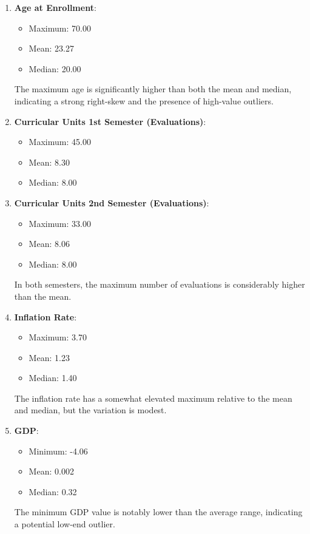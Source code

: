 \documentclass[12pt]{article}
\begin{document}
\begin{enumerate}
    \item \textbf{Age at Enrollment}:
    \begin{itemize}
        \item Maximum: 70.00
        \item Mean: 23.27
        \item Median: 20.00
    \end{itemize}
    The maximum age is significantly higher than both the mean and median, indicating a strong right-skew and the presence of high-value outliers.

    \item \textbf{Curricular Units 1st Semester (Evaluations)}:
    \begin{itemize}
        \item Maximum: 45.00
        \item Mean: 8.30
        \item Median: 8.00
    \end{itemize}

    \item \textbf{Curricular Units 2nd Semester (Evaluations)}:
    \begin{itemize}
        \item Maximum: 33.00
        \item Mean: 8.06
        \item Median: 8.00
    \end{itemize}
    In both semesters, the maximum number of evaluations is considerably higher than the mean.

    \item \textbf{Inflation Rate}:
    \begin{itemize}
        \item Maximum: 3.70
        \item Mean: 1.23
        \item Median: 1.40
    \end{itemize}
    The inflation rate has a somewhat elevated maximum relative to the mean and median, but the variation is modest.

    \item \textbf{GDP}:
    \begin{itemize}
        \item Minimum: -4.06
        \item Mean: 0.002
        \item Median: 0.32
    \end{itemize}
    The minimum GDP value is notably lower than the average range, indicating a potential low-end outlier.
\end{enumerate}
\end{document}
